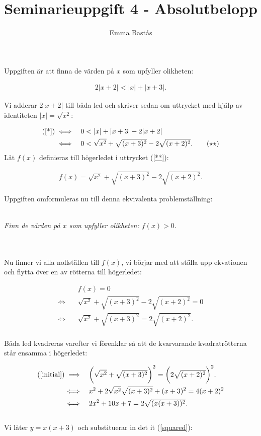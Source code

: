 \documentclass{article}
\title{Seminarieuppgift 4 - Absolutbelopp}
\author{Emma Bastås}
\begin{document}
\maketitle

\noindent Uppgiften är att finna de värden på $x$ som upfyller olikheten:

\begin{gather*}
  2|x+2| < |x| + |x+3|\text{.} \label{*}\tag{$\star$}
\end{gather*}

\noindent Vi adderar $2|x+2|$ till båda led och skriver sedan om uttrycket med hjälp av identiteten $|x| = \sqrt{x^{2}}$:

\begin{align*}
  \text{(\ref{*})} \iff& \quad 0 < |x| + |x + 3| - 2|x+2| \\
  \iff& \quad 0 < \sqrt{x^{2}} + \sqrt{(x + 3)^{2}} - 2 \sqrt{(x + 2)^{2}}\text{.} \label{**}\tag{$\star\star$}
\end{align*}
\noindent Låt $f(x)$ definieras till högerledet i uttrycket (\ref{**}):

\begin{gather*}
  f(x) =  \sqrt{x^{2}} + \sqrt{(x + 3)^{2}} - 2 \sqrt{(x + 2)^{2}}\text{.}
\end{gather*}

\noindent Uppgiften omformuleras nu till denna ekvivalenta problemställning:
\\
\\
\centerline{\emph{Finn de värden på $x$ som upfyller olikheten: $f(x) > 0$.}}
\\
\\
Nu finner vi alla nollställen till $f(x)$, vi börjar med att ställa upp ekvationen och flytta över en av rötterna till högerledet:

\begin{align}
  \quad & f(x) = 0 \nonumber\\
  \iff \quad &\sqrt{x^{2}} + \sqrt{(x + 3)^{2}} - 2 \sqrt{(x + 2)^{2}} = 0 \nonumber\\
  \iff \quad &\sqrt{x^{2}} + \sqrt{(x + 3)^{2}} = 2 \sqrt{(x + 2)^{2}}\text{.} \label{initial}
\end{align}
\\
Båda led kvadreras varefter vi förenklar så att de kvarvarande kvadratrötterna står ensamma i högerledet:

\begin{align}
  \text{(\ref{initial})} \implies \quad & \biggl(\sqrt{x^{2}} + \sqrt{(x + 3)^{2}}\biggr)^{2} = \biggl(2 \sqrt{(x + 2)^{2}}\biggr)^{2}\text{.} \nonumber\\
  \iff \quad & x^{2} + 2\sqrt{x^{2}}\sqrt{(x+3)^{2}} + (x + 3)^{2} = 4(x+2)^{2} \nonumber\\
  \iff \quad & 2x^{2} + 10x + 7 = 2\sqrt{(x(x+3))^{2}}\text{.} \label{squared}
\end{align}
\\
Vi låter $y = x(x+3)$ och substituerar in det it (\ref{squared}):
\end{document}
